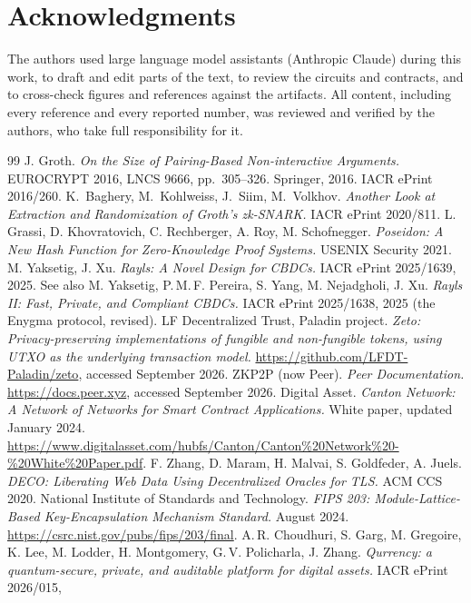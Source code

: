 \documentclass[11pt]{article}
\begin{document}
\section*{Acknowledgments}
The authors used large language model assistants (Anthropic Claude) during
this work, to draft and edit parts of the text, to review the circuits and
contracts, and to cross-check figures and references against the artifacts.
All content, including every reference and every reported number, was
reviewed and verified by the authors, who take full responsibility for it.

\begin{thebibliography}{99}
 J. Groth. \emph{On the Size of Pairing-Based Non-interactive
Arguments.} EUROCRYPT 2016, LNCS 9666, pp.~305--326. Springer, 2016. IACR
ePrint 2016/260.
 K.~Baghery, M.~Kohlweiss, J.~Siim, M.~Volkhov. \emph{Another Look at Extraction and Randomization of Groth's zk-SNARK.} IACR ePrint 2020/811.
 L. Grassi, D. Khovratovich, C. Rechberger, A. Roy,
M. Schofnegger. \emph{Poseidon: A New Hash Function for Zero-Knowledge Proof
Systems.} USENIX Security 2021.
 M. Yaksetig, J. Xu. \emph{Rayls: A Novel Design for CBDCs.}
IACR ePrint 2025/1639, 2025. See also M. Yaksetig, P.\,M.\,F. Pereira,
S. Yang, M. Nejadgholi, J. Xu. \emph{Rayls II: Fast, Private, and Compliant
CBDCs.} IACR ePrint 2025/1638, 2025 (the Enygma protocol, revised).
 LF Decentralized Trust, Paladin project. \emph{Zeto:
Privacy-preserving implementations of fungible and non-fungible tokens, using
UTXO as the underlying transaction model.}
\url{https://github.com/LFDT-Paladin/zeto}, accessed September 2026.
 ZKP2P (now Peer). \emph{Peer Documentation.}
\url{https://docs.peer.xyz}, accessed September 2026.
 Digital Asset. \emph{Canton Network: A Network of Networks for
Smart Contract Applications.} White paper, updated January 2024.
\url{https://www.digitalasset.com/hubfs/Canton/Canton%20Network%20-%20White%20Paper.pdf}.
 F. Zhang, D. Maram, H. Malvai, S. Goldfeder, A. Juels.
\emph{DECO: Liberating Web Data Using Decentralized Oracles for TLS.} ACM CCS
2020.
 National Institute of Standards and Technology. \emph{FIPS 203:
Module-Lattice-Based Key-Encapsulation Mechanism Standard.} August 2024.
\url{https://csrc.nist.gov/pubs/fips/203/final}.
 A.\,R. Choudhuri, S. Garg, M. Gregoire, K. Lee, M. Lodder,
H. Montgomery, G.\,V. Policharla, J. Zhang. \emph{Qurrency: a quantum-secure,
private, and auditable platform for digital assets.} IACR ePrint 2026/015,

\end{thebibliography}
\end{document}
